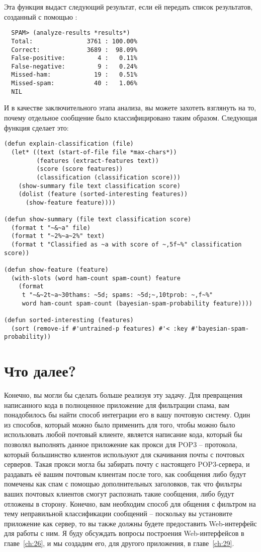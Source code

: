 Эта функция выдаст следующий результат, если ей передать список результатов, созданный с
помощью :

\begin{verbatim}
  SPAM> (analyze-results *results*)
  Total:               3761 : 100.00%
  Correct:             3689 :  98.09%
  False-positive:         4 :   0.11%
  False-negative:         9 :   0.24%
  Missed-ham:            19 :   0.51%
  Missed-spam:           40 :   1.06%
  NIL
\end{verbatim}

И в качестве заключительного этапа анализа, вы можете захотеть взглянуть на то, почему
отдельное сообщение было классифицировано таким образом.  Следующая функция сделает это:

\begin{lstlisting}
(defun explain-classification (file)
  (let* ((text (start-of-file file *max-chars*))
         (features (extract-features text))
         (score (score features))
         (classification (classification score)))
    (show-summary file text classification score)
    (dolist (feature (sorted-interesting features))
      (show-feature feature))))

(defun show-summary (file text classification score)
  (format t "~&~a" file)
  (format t "~2%~a~2%" text)
  (format t "Classified as ~a with score of ~,5f~%" classification score))

(defun show-feature (feature)
  (with-slots (word ham-count spam-count) feature
    (format
     t "~&~2t~a~30thams: ~5d; spams: ~5d;~,10tprob: ~,f~%"
     word ham-count spam-count (bayesian-spam-probability feature))))

(defun sorted-interesting (features)
  (sort (remove-if #'untrained-p features) #'< :key #'bayesian-spam-probability))
\end{lstlisting}

\section{Что далее?}

Конечно, вы могли бы сделать больше реализуя эту задачу.  Для превращения написанного кода
в полноценное приложение для фильтрации спама, вам понадобилось бы найти способ интеграции
его в вашу почтовую систему.  Один из способов, который можно было применить для того,
чтобы можно было использовать любой почтовый клиенте, является написание кода, который бы
позволял выполнять данное приложение как прокси для POP3 -- протокола, который большинство
клиентов используют для скачивания почты с почтовых серверов.  Такая прокси могла бы
забирать почту с настоящего POP3-сервера, и раздавать её вашим почтовым клиентам после
того, как сообщения либо будут помечены как спам с помощью дополнительных заголовков, так
что фильтры ваших почтовых клиентов смогут распознать такие сообщения, либо будут отложены
в сторону.  Конечно, вам необходим способ для общения с фильтром на тему неправильной
классификации сообщений -- поскольку вы установите приложение как сервер, то вы также
должны будете предоставить Web-интерфейс для работы с ним.  Я буду обсуждать вопросы
построения Web-интерфейсов в главе~\ref{ch:26}, и мы создадим его, для другого приложения,
в главе~\ref{ch:29}.

